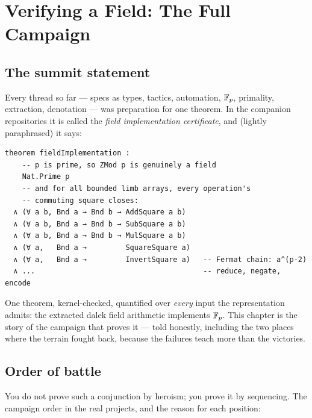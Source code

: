 \chapter{Verifying a Field: The Full Campaign}
\label{ch:field}

\section{The summit statement}

Every thread so far --- specs as types, tactics, automation, $\mathbb{F}_p$,
primality, extraction, denotation --- was preparation for one theorem. In
the companion repositories it is called the \emph{field implementation
certificate}, and (lightly paraphrased) it says:

\begin{lstlisting}[language=Lean]
theorem fieldImplementation :
    -- p is prime, so ZMod p is genuinely a field
    Nat.Prime p
    -- and for all bounded limb arrays, every operation's
    -- commuting square closes:
  ∧ (∀ a b, Bnd a → Bnd b → AddSquare a b)
  ∧ (∀ a b, Bnd a → Bnd b → SubSquare a b)
  ∧ (∀ a b, Bnd a → Bnd b → MulSquare a b)
  ∧ (∀ a,   Bnd a →         SquareSquare a)
  ∧ (∀ a,   Bnd a →         InvertSquare a)   -- Fermat chain: a^(p-2)
  ∧ ...                                       -- reduce, negate, encode
\end{lstlisting}

One theorem, kernel-checked, quantified over \emph{every} input the
representation admits: the extracted dalek field arithmetic implements
$\mathbb{F}_p$. This chapter is the story of the campaign that proves it --- told
honestly, including the two places where the terrain fought back, because
the failures teach more than the victories.

\section{Order of battle}

You do not prove such a conjunction by heroism; you prove it by sequencing.
The campaign order in the real projects, and the reason for each position:

